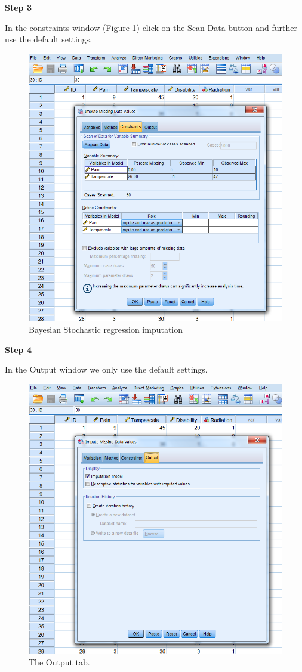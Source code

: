 \documentclass[
]{book}
\begin{document}
\textbf{Step 3}

In the constraints window (Figure \ref{fig:fig3-20}) click on the Scan Data button and further use the default settings.

\begin{figure}

{\centering \includegraphics[width=0.7\linewidth]{images/fig3.20} 

}

\caption{Bayesian Stochastic regression imputation}\label{fig:fig3-20}
\end{figure}

\textbf{Step 4}

In the Output window we only use the default settings.

\begin{figure}

{\centering \includegraphics[width=0.7\linewidth]{images/fig3.21} 

}

\caption{The Output tab.}\label{fig:fig3-21}
\end{figure}
\end{document}
